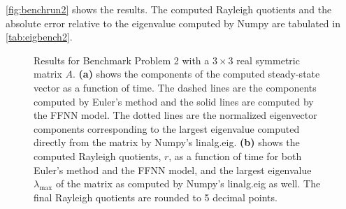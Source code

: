 \autoref{fig:benchrun2} shows the results. The computed Rayleigh quotients and the absolute error relative to the eigenvalue computed by Numpy are tabulated in \autoref{tab:eigbench2}. 

\begin{figure}[H]
\centering
{}
\qquad
{}
\caption{Results for Benchmark Problem 2 with a $3\times 3$ real symmetric matrix $A$. \textbf{(a)} shows the components of the computed steady-state vector as a function of time. The dashed lines are the components computed by Euler's method and the solid lines are computed by the FFNN model. The dotted lines are the normalized eigenvector components corresponding to the largest eigenvalue computed directly from the matrix by Numpy's linalg.eig. \textbf{(b)} shows the computed Rayleigh quotients, $r$, as a function of time for both Euler's method and the FFNN model, and the largest eigenvalue $\lambda_\mathrm{max}$ of the matrix as computed by Numpy's linalg.eig as well. The final Rayleigh quotients are rounded to 5 decimal points.}
\label{fig:benchrun2}
\end{figure}

